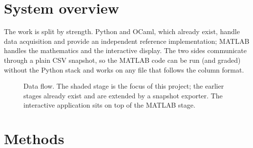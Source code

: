 \documentclass[11pt]{article}
\begin{document}
\section{System overview}
The work is split by strength. Python and OCaml, which already exist, handle data acquisition and provide an independent reference implementation; MATLAB handles the mathematics and the interactive display. The two sides communicate through a plain CSV snapshot, so the MATLAB code can be run (and graded) without the Python stack and works on any file that follows the column format.

\begin{figure}[h]
\centering
{}
\caption{Data flow. The shaded stage is the focus of this project; the earlier stages already exist and are extended by a snapshot exporter. The interactive application sits on top of the MATLAB stage.}
\end{figure}

\section{Methods}
\end{document}
